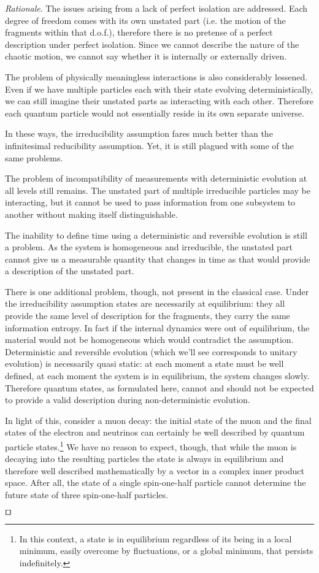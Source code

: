 \documentclass[smallextended]{svjour3}
\numberwithin{equation}{section}
\newenvironment{rationale}{\emph{Rationale}.}{\hfill\(\qed\)}
\begin{document}
\begin{rationale}
	The issues arising from a lack of perfect isolation are addressed. Each degree of freedom comes with its own unstated part (i.e. the motion of the fragments within that d.o.f.), therefore there is no pretense of a perfect description under perfect isolation. Since we cannot describe the nature of the chaotic motion, we cannot say whether it is internally or externally driven.
	
	The problem of physically meaningless interactions is also considerably lessened. Even if we have multiple particles each with their state evolving deterministically, we can still imagine their unstated parts as interacting with each other. Therefore each quantum particle would not essentially reside in its own separate universe.
	
	In these ways, the irreducibility assumption fares much better than the infinitesimal reducibility assumption. Yet, it is still plagued with some of the same problems.
	
	The problem of incompatibility of measurements with deterministic evolution at all levels still remains. The unstated part of multiple irreducible particles may be interacting, but it cannot be used to pass information from one subsystem to another without making itself distinguishable.
	
	The inability to define time using a deterministic and reversible evolution is still a problem. As the system is homogeneous and irreducible, the unstated part cannot give us a measurable quantity that changes in time as that would provide a description of the unstated part.
	
	There is one additional problem, though, not present in the classical case. Under the irreducibility assumption states are necessarily at equilibrium: they all provide the same level of description for the fragments, they carry the same information entropy. In fact if the internal dynamics were out of equilibrium, the material would not be homogeneous which would contradict the assumption. Deterministic and reversible evolution (which we'll see corresponds to unitary evolution) is necessarily quasi static: at each moment a state must be well defined, at each moment the system is in equilibrium, the system changes slowly. Therefore quantum states, as formulated here, cannot and should not be expected to provide a valid description during non-deterministic evolution.
	
	In light of this, consider a muon decay: the initial state of the muon and the final states of the electron and neutrinos can certainly be well described by quantum particle states.\footnote{In this context, a state is in equilibrium regardless of its being in a local minimum, easily overcome by fluctuations, or a global minimum, that persists indefinitely.} We have no reason to expect, though, that while the muon is decaying into the resulting particles the state is always in equilibrium and therefore well described mathematically by a vector in a complex inner product space. After all, the state of a single spin-one-half particle cannot determine the future state of three spin-one-half particles.
	

\end{rationale}
\end{document}
